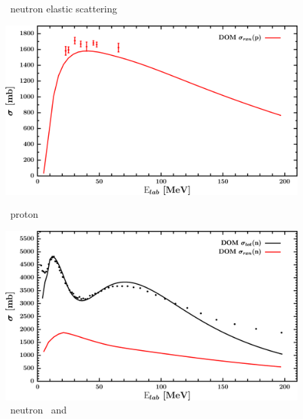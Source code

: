 \begin{figure}[hbtp]
\begin{minipage}{0.47\textwidth}
        \caption*{\snFour\ neutron elastic scattering}
        \label{DOMFitData_sn124_neutron_elastic}
    \end{minipage}
\end{figure}
\vspace{0.70in}
\begin{figure}[hbtp]
    \centering
    \begin{minipage}{0.47\textwidth}
        \centering
        \includegraphics[width=\linewidth]{figures/sn124_protonInelastic.png}
        \caption*{\snFour\ proton \rxn}
        \label{DOMFitData_sn124_proton_inelastic}
    \end{minipage}\hspace{6pt}
    \begin{minipage}{0.47\textwidth}
        \centering
        \includegraphics[width=\textwidth]{figures/sn124_neutronInelastic.png}
        \caption*{\snFour\ neutron \rxn\ and \tot}
        \label{DOMFitData_sn124_neutron_inelastic}
    \end{minipage}
\end{figure}
